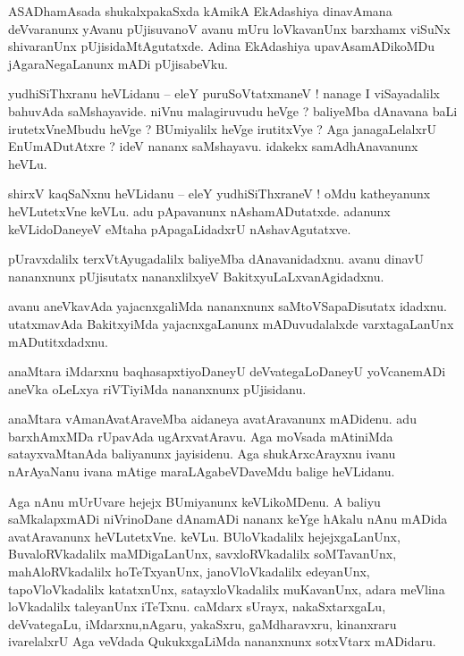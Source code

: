 \documentclass{article}
\begin{document}
\begin{mn}%
ASADhamAsada shukalxpakaSxda kAmikA EkAdashiya dinavAmana deVvaranunx yAvanu pUjisuvanoV avanu mUru 
loVkavanUnx barxhamx viSuNx shivaranUnx pUjisidaMtAgutatxde. Adina EkAdashiya upavAsamADikoMDu 
jAgaraNegaLanunx mADi pUjisabeVku.
\end{mn}

\begin{mn}%
yudhiSiThxranu heVLidanu -- eleY puruSoVtatxmaneV ! nanage I viSayadalilx bahuvAda saMshayavide. 
niVnu malagiruvudu heVge ? baliyeMba dAnavana baLi irutetxVneMbudu heVge ? BUmiyalilx heVge 
irutitxVye ? Aga janagaLelalxrU EnUmADutAtxre ? ideV nananx saMshayavu. idakekx samAdhAnavanunx 
heVLu. 
\end{mn}

\begin{mn}%
shirxV kaqSaNxnu heVLidanu -- eleY yudhiSiThxraneV ! oMdu katheyanunx heVLutetxVne keVLu. adu 
pApavanunx nAshamADutatxde. adanunx keVLidoDaneyeV eMtaha pApagaLidadxrU nAshavAgutatxve.
\end{mn}

\begin{mn}%
pUravxdalilx terxVtAyugadalilx baliyeMba dAnavanidadxnu. avanu dinavU nananxnunx pUjisutatx 
nananxlilxyeV BakitxyuLaLxvanAgidadxnu.
\end{mn}

\begin{mn}%
avanu aneVkavAda yajacnxgaliMda nananxnunx saMtoVSapaDisutatx idadxnu. utatxmavAda BakitxyiMda 
yajacnxgaLanunx mADuvudalalxde varxtagaLanUnx mADutitxdadxnu.
\end{mn}

\begin{mn}%
anaMtara iMdarxnu baqhasapxtiyoDaneyU deVvategaLoDaneyU yoVcanemADi aneVka oLeLxya riVTiyiMda 
nananxnunx pUjisidanu.
\end{mn}

\begin{mn}%
anaMtara vAmanAvatAraveMba aidaneya avatAravanunx mADidenu. adu barxhAmxMDa rUpavAda ugArxvatAravu. 
Aga moVsada mAtiniMda satayxvaMtanAda baliyanunx jayisidenu. Aga shukArxcArayxnu ivanu nArAyaNanu 
ivana mAtige maraLAgabeVDaveMdu balige heVLidanu.
\end{mn}

\begin{mn}%
Aga nAnu mUrUvare hejejx BUmiyanunx keVLikoMDenu. A baliyu saMkalapxmADi niVrinoDane dAnamADi 
nananx keYge hAkalu nAnu mADida avatAravanunx heVLutetxVne. keVLu. BUloVkadalilx hejejxgaLanUnx, 
BuvaloRVkadalilx maMDigaLanUnx, savxloRVkadalilx soMTavanUnx, mahAloRVkadalilx hoTeTxyanUnx, 
janoVloVkadalilx edeyanUnx, tapoVloVkadalilx katatxnUnx, satayxloVkadalilx muKavanUnx, adara 
meVlina loVkadalilx taleyanUnx iTeTxnu. caMdarx sUrayx, nakaSxtarxgaLu, deVvategaLu, 
iMdarxnu,nAgaru, yakaSxru, gaMdharavxru, kinanxraru ivarelalxrU Aga veVdada QukukxgaLiMda 
nananxnunx sotxVtarx mADidaru.
\end{mn}
\end{document}
